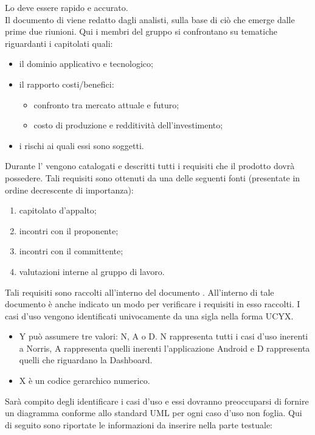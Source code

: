 			Lo  deve essere rapido e accurato.\\
			Il documento di  viene redatto dagli analisti, sulla base di ciò che emerge dalle prime due riunioni. Qui i membri del gruppo si confrontano su tematiche riguardanti i capitolati quali:
			\begin{itemize}
				\item il dominio applicativo e tecnologico;
				\item il rapporto costi/benefici:
				\begin{itemize}
					\item confronto tra mercato attuale e futuro;
					\item costo di produzione e redditività dell'investimento;
				\end{itemize}
				\item i rischi ai quali essi sono soggetti.
			\end{itemize}
			Durante l' vengono catalogati e descritti tutti i requisiti che il prodotto dovrà possedere. Tali requisiti sono ottenuti da una delle seguenti fonti (presentate in ordine decrescente di importanza):
			\begin{enumerate}
				\item capitolato d’appalto;
				\item incontri con il proponente;
				\item incontri con il committente;
				\item valutazioni interne al gruppo di lavoro.
			\end{enumerate}
			Tali requisiti sono raccolti all'interno del documento . All'interno di tale documento è anche indicato un modo per verificare i requisiti in esso raccolti.
			I casi d'uso vengono identificati univocamente da una sigla nella forma UCYX.
			\begin{itemize}
				\item Y può assumere tre valori: N, A o D. N rappresenta tutti i casi d'uso inerenti a Norris, A rappresenta quelli inerenti l'applicazione Android e D rappresenta quelli che riguardano la Dashboard.
				\item X è un codice gerarchico numerico.
			\end{itemize}
			Sarà compito degli  identificare i casi d'uso e essi dovranno preoccuparsi di fornire un diagramma conforme allo standard UML per ogni caso d'uso non foglia. Qui di seguito sono riportate le informazioni da inserire nella parte testuale:
